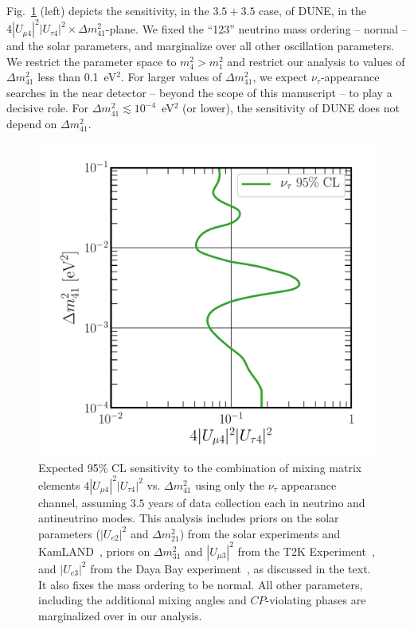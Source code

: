 \documentclass[aps,prd,onecolumn,nofootinbib,superscriptaddress, 11pt]{revtex4}
\begin{document}
Fig.~\ref{fig:SimpleSterile} (left) depicts the sensitivity, in the $3.5+3.5$ case, of DUNE, in the $4|U_{\mu4}|^2|U_{\tau4}|^2\times \Delta m^2_{41}$-plane. We fixed the ``123'' neutrino mass ordering -- normal -- and the solar parameters, and marginalize over all other oscillation parameters. We restrict the parameter space to $m_4^2>m_1^2$ and restrict our analysis to values of $\Delta m^2_{41}$ less than 0.1~eV$^2$. For larger values of $\Delta m^2_{41}$, we expect $\nu_{\tau}$-appearance searches in the near detector -- beyond the scope of this manuscript -- to play a decisive role. For $\Delta m^2_{41}\lesssim 10^{-4}$~eV$^2$ (or lower),  the sensitivity of DUNE does not depend on $\Delta m^2_{41}$.
\begin{figure}[ht]
\center
\includegraphics[width=0.55\linewidth]{Sterile_TauChannel_4Umu4Utau4.pdf}
\caption{Expected 95\% CL sensitivity to the combination of mixing matrix elements $4|U_{\mu 4}|^2 |U_{\tau 4}|^2$ vs. $\Delta m_{41}^2$ using only the $\nu_\tau$ appearance channel, assuming $3.5$ years of data collection each in neutrino and antineutrino modes. This analysis includes priors on the solar parameters ($|U_{e2}|^2$ and $\Delta m_{21}^2$) from the solar experiments and KamLAND~\cite{Esteban:2018azc}, priors on $\Delta m_{31}^2$ and $|U_{\mu 3}|^2$ from the T2K Experiment~\cite{Abe:2018wpn}, and $|U_{e3}|^2$ from the Daya Bay experiment~\cite{Adey:2018zwh}, as discussed in the text. It also fixes the mass ordering to be normal. All other parameters, including the additional mixing angles and $CP$-violating phases are marginalized over in our analysis.}
\label{fig:SimpleSterile}
\end{figure}
\end{document}
